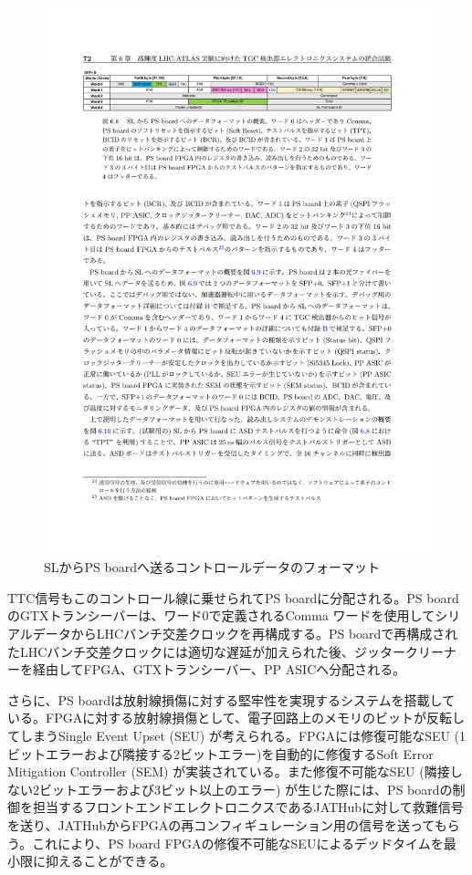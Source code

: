     \begin{figure} 
        \centering
        \includegraphics[width=16cm]{fig/Intro/TGC_PSBdownlink.pdf}
        \caption[SLからPS boardへ送るコントロールデータのフォーマット]{SLからPS boardへ送るコントロールデータのフォーマット\cite{mt_aoki}}
        \label{TGC_PSBdownlink}
    \end{figure}
    
    TTC信号もこのコントロール線に乗せられてPS boardに分配される。PS boardのGTXトランシーバーは、ワード0で定義されるComma ワードを使用してシリアルデータからLHCバンチ交差クロックを再構成する。PS boardで再構成されたLHCバンチ交差クロックには適切な遅延が加えられた後、ジッタークリーナーを経由してFPGA、GTXトランシーバー、PP ASICへ分配される。    

    さらに、PS boardは放射線損傷に対する堅牢性を実現するシステムを搭載している。FPGAに対する放射線損傷として、電子回路上のメモリのビットが反転してしまうSingle Event Upset (SEU) が考えられる。FPGAには修復可能なSEU (1ビットエラーおよび隣接する2ビットエラー)を自動的に修復するSoft Error Mitigation Controller (SEM) が実装されている。また修復不可能なSEU (隣接しない2ビットエラーおよび3ビット以上のエラー) が生じた際には、PS boardの制御を担当するフロントエンドエレクトロニクスであるJATHubに対して救難信号を送り、JATHubからFPGAの再コンフィギュレーション用の信号を送ってもらう。これにより、PS board FPGAの修復不可能なSEUによるデッドタイムを最小限に抑えることができる。

